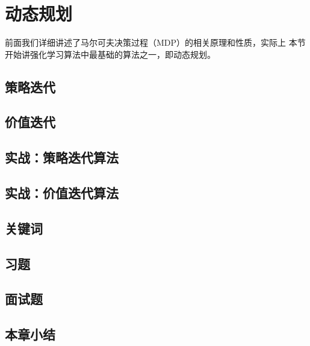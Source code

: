 \section{动态规划}
前面我们详细讲述了马尔可夫决策过程（MDP）的相关原理和性质，实际上 
本节开始讲强化学习算法中最基础的算法之一，即动态规划。
\subsection{策略迭代}
\subsection{价值迭代}
\subsection{实战：策略迭代算法}
\subsection{实战：价值迭代算法}
\subsection{关键词}
\subsection{习题}
\subsection{面试题}
\subsection{本章小结}